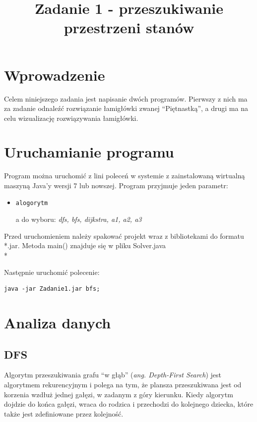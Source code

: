 \documentclass{classrep}
\author{
  \studentinfo{Łukasz Ochmański}{183566} \and
  \studentinfo{Przemysław Szwajkowski}{173524}
}
\title{Zadanie 1 - przeszukiwanie przestrzeni stanów}
\begin{document}
\maketitle


\section{Wprowadzenie}
Celem niniejszego zadania jest napisanie dwóch programów. Pierwszy z nich ma za zadanie odnaleźć rozwiązanie łamigłówki zwanej ``Piętnastką'', a drugi ma na celu wizualizację rozwiązywania łamigłówki.

\section{Uruchamianie programu}
Program można uruchomić z lini poleceń w systemie z zainstalowaną wirtualną maszyną Java'y wersji 7 lub nowszej. Program przyjmuje jeden parametr:

\begin{itemize}
  \item \begin{verbatim}alogorytm\end{verbatim} a do wyboru: \emph{dfs, bfs, dijkstra, a1, a2, a3}
\end{itemize}

Przed uruchomieniem należy spakować projekt wraz z bibliotekami do formatu *.jar.
Metoda main() znajduje się w pliku Solver.java
\\*

Następnie uruchomić polecenie:

\begin{verbatim}
java -jar Zadanie1.jar bfs;
\end{verbatim}
	
\section{Analiza danych}
  \subsection{DFS}
  \label{subsec:DFS}
    Algorytm przeszukiwania grafu ``w głąb'' (\textit{ang. Depth-First Search}) jest algorytmem rekurencyjnym i polega na tym, że plansza przeszukiwana jest od korzenia wzdłuż jednej gałęzi, w zadanym z góry kierunku. Kiedy algorytm dojdzie do końca gałęzi, wraca do rodzica i przechodzi do kolejnego dziecka, które także jest zdefiniowane przez kolejność.
\end{document}
